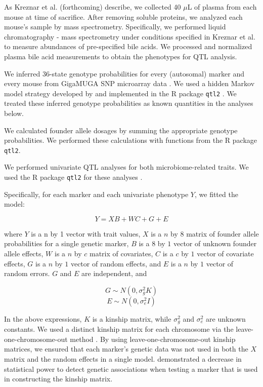 \documentclass{book}
\begin{document}
As Kreznar et al. (forthcoming) describe, we collected 40 $\mu$L of plasma from each mouse at time of sacrifice. After removing soluble proteins, we analyzed each mouse's sample by mass spectrometry. Specifically, we performed liquid chromatography - mass spectrometry under conditions specified in Kreznar et al. to measure abundances of pre-specified bile acids. We processed and normalized plasma bile acid measurements to obtain the phenotypes for QTL analysis.

We inferred 36-state genotype probabilities for every (autosomal) marker and every mouse from GigaMUGA SNP microarray data \citep{morgan2015mouse}. We used a hidden Markov model strategy developed by \citet{broman2012genotype, broman2012haplotype} and implemented in the R package \texttt{qtl2} \citep{qtl2}. We treated these inferred genotype probabilities as known quantities in the analyses below.

We calculated founder allele dosages by summing the appropriate genotype probabilities. We performed these calculations with functions from the R package \texttt{qtl2}\citep{qtl2}.

We performed univariate QTL analyses for both microbiome-related traits. We used the R package \texttt{qtl2} for these analyses \citep{qtl2}.

Specifically, for each marker and each univariate phenotype $Y$, we fitted the model:

\begin{equation}
Y = XB + WC + G + E  
\label{eq:uni-model}
\end{equation}

where $Y$ is a n by 1 vector with trait values, $X$ is a $n$ by $8$ matrix of founder allele probabilities for a single genetic marker, $B$ is a $8$ by $1$ vector of unknown founder allele effects, $W$ is a $n$ by $c$ matrix of covariates, $C$ is a $c$ by $1$ vector of covariate effects, $G$ is a $n$ by $1$ vector of random effects, and $E$ is a $n$ by $1$ vector of random errors. $G$ and $E$ are independent, and 

\begin{equation}
G \sim N(0, \sigma^2_g K)    
\end{equation}
\begin{equation}
E \sim N(0, \sigma^2_e I)    
\end{equation}


In the above expressions, $K$ is a kinship matrix, while $\sigma^2_g$ and $\sigma^2_e$ are unknown constants. We used a distinct kinship matrix for each chromosome via the leave-one-chromosome-out method \citep{yang2014advantages}. By using leave-one-chromosome-out kinship matrices, we ensured that each marker's genetic data was not used in both the $X$ matrix and the random effects in a single model. \citet{yang2014advantages} demonstrated a decrease in statistical power to detect genetic associations when testing a marker that is used in constructing the kinship matrix. 
\end{document}
